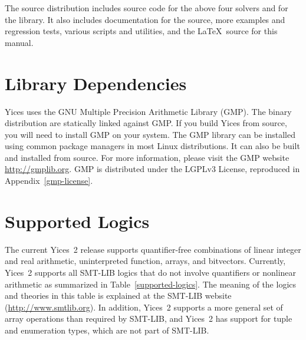 \documentclass[11pt,twoside,fleqn,openright,titlepage]{cslreport}
\begin{document}
The source distribution includes source code for the above four
solvers and for the library. It also includes documentation for the
source, more examples and regression tests, various scripts and
utilities, and the \LaTeX\ source for this manual.


\section{Library Dependencies}

Yices uses the GNU Multiple Precision Arithmetic Library (GMP).  The
binary distribution are statically linked against GMP. If you build
Yices from source, you will need to install GMP on your system.  The
GMP library can be installed using common package managers in most
Linux distributions. It can also be built and installed from
source. For more information, please visit the GMP website
\url{http://gmplib.org}. GMP is distributed under the LGPLv3 License,
reproduced in Appendix~\ref{gmp-license}.


\section{Supported Logics}

The current  Yices~2 release supports quantifier-free  combinations of
linear integer  and real  arithmetic, uninterpreted  function, arrays,
and bitvectors. Currently, Yices~2 supports all SMT-LIB logics that do
not  involve  quantifiers or  nonlinear  arithmetic  as summarized  in
Table~\ref{supported-logics}.  The meaning of  the logics and theories
in    this   table    is    explained   at    the   SMT-LIB    website
(\url{http://www.smtlib.org}).  In  addition, Yices~2 supports  a more
general set of array operations  than required by SMT-LIB, and Yices~2
has support  for tuple and  enumeration types,  which are not  part of
SMT-LIB.


\newcommand{\desc}[1]{\parbox[c][1.6em][c]{9cm}{{\footnotesize #1}}}
\newcommand{\ddesc}[1]{\parbox[c][2.6em]{9cm}{{\footnotesize #1}}}
\end{document}
